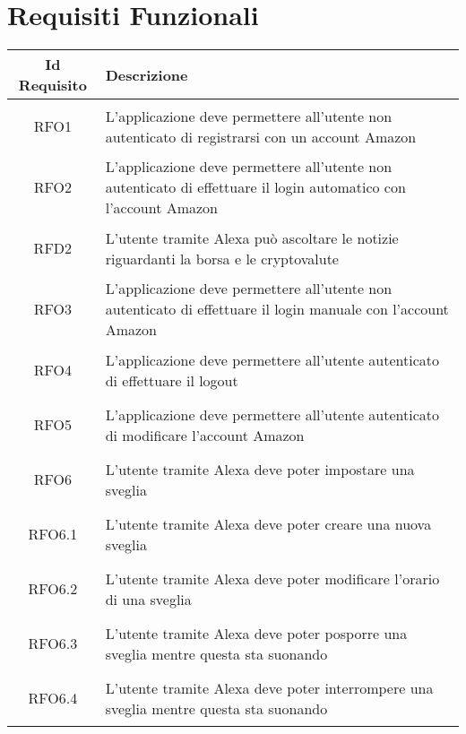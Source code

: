 \section{Requisiti Funzionali}
\normalsize
\begin{longtable}{|c|X|}
	\hline
	\textbf{Id Requisito} & \textbf{Descrizione}\\
	\hline
	\endhead
	\hypertarget{RFO1}{RFO1} & L'applicazione deve permettere all'utente non autenticato di registrarsi con un account Amazon\\ \hline
	
	\hypertarget{RFO2}{RFO2} & L'applicazione deve permettere all'utente non autenticato di effettuare il login automatico con l'account Amazon\\ \hline
	
	\hypertarget{RFD2}{RFD2} & L'utente tramite Alexa può ascoltare le notizie riguardanti la borsa e le cryptovalute \\ \hline
	
	\hypertarget{RFO3}{RFO3} & L'applicazione deve permettere all'utente non autenticato di effettuare il login manuale con l'account Amazon \\ \hline
	
	\hypertarget{RFO4}{RFO4} & L'applicazione deve permettere all'utente autenticato di effettuare il logout \\ \hline
	
	\hypertarget{RFO5}{RFO5} & L'applicazione deve permettere all'utente autenticato di modificare l'account Amazon \\ \hline
	
	\hypertarget{RFO6}{RFO6} & L'utente tramite Alexa deve poter impostare una sveglia \\ \hline
	
	\hypertarget{RFO6.1}{RFO6.1} & L'utente tramite Alexa deve poter creare una nuova sveglia\\ \hline
	
	\hypertarget{RFO6.2}{RFO6.2} & L'utente tramite Alexa deve poter modificare l'orario di una sveglia\\ \hline
	
	\hypertarget{RFO6.3}{RFO6.3} & L'utente tramite Alexa deve poter posporre una sveglia mentre questa sta suonando \\ \hline
	
	\hypertarget{RFO6.4}{RFO6.4} & L'utente tramite Alexa deve poter interrompere una sveglia mentre questa sta suonando\\ \hline
	

\end{longtable}
